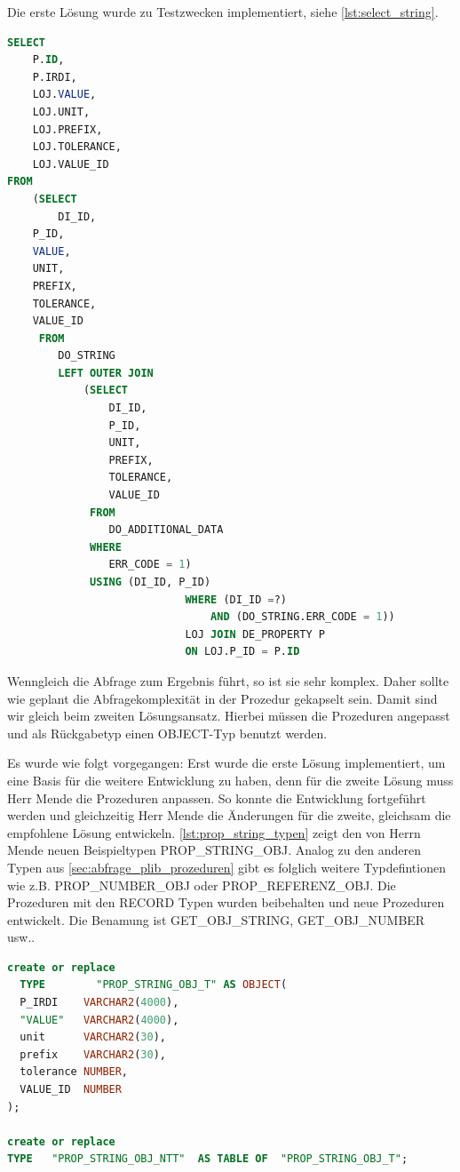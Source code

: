 Die erste Lösung wurde zu Testzwecken implementiert, siehe \autoref{lst:select_string}.

\begin{lstlisting}[caption=SELECT-Abfrage für String-Properties aus den Prozeduren, language=sql, label=lst:select_string]
SELECT 
    P.ID, 
    P.IRDI, 
    LOJ.VALUE, 
    LOJ.UNIT, 
    LOJ.PREFIX, 
    LOJ.TOLERANCE, 
    LOJ.VALUE_ID 
FROM 
    (SELECT 
    	DI_ID, 
	P_ID, 
	VALUE, 
	UNIT, 
	PREFIX, 
	TOLERANCE, 
	VALUE_ID
     FROM 
     	DO_STRING 
		LEFT OUTER JOIN 
			(SELECT 
				DI_ID, 
				P_ID, 
				UNIT, 
				PREFIX, 
				TOLERANCE, 
				VALUE_ID
			 FROM 
			 	DO_ADDITIONAL_DATA 
			 WHERE 
			 	ERR_CODE = 1)
			 USING (DI_ID, P_ID)
                          	WHERE (DI_ID =?) 
                          		AND (DO_STRING.ERR_CODE = 1))
                          	LOJ JOIN DE_PROPERTY P  
                          	ON LOJ.P_ID = P.ID
\end{lstlisting}

Wenngleich die Abfrage zum Ergebnis führt, so ist sie sehr komplex. Daher sollte wie geplant die Abfragekomplexität in der Prozedur gekapselt sein. Damit sind wir gleich beim zweiten Lösungsansatz. Hierbei müssen die Prozeduren angepasst und als Rückgabetyp einen OBJECT-Typ benutzt werden. 

Es wurde wie folgt vorgegangen: 
Erst wurde die erste Lösung implementiert, um eine Basis für die weitere Entwicklung zu haben, denn für die zweite Lösung muss Herr Mende die Prozeduren anpassen. So konnte die Entwicklung fortgeführt werden und gleichzeitig Herr Mende die Änderungen für die zweite, gleichsam die empfohlene Lösung entwickeln. \autoref{lst:prop_string_typen} zeigt den von Herrn Mende neuen Beispieltypen PROP\_STRING\_OBJ. Analog zu den anderen Typen aus \autoref{sec:abfrage_plib_prozeduren} gibt es folglich weitere Typdefintionen wie z.B. PROP\_NUMBER\_OBJ oder PROP\_REFERENZ\_OBJ. 
Die Prozeduren mit den RECORD Typen wurden beibehalten und neue Prozeduren entwickelt. Die Benamung ist GET\_OBJ\_STRING, GET\_OBJ\_NUMBER usw..

\begin{lstlisting}[caption=PROP\_STRING\_OBJ Typen, language=sql, label=lst:prop_string_typen]
create or replace
  TYPE        "PROP_STRING_OBJ_T" AS OBJECT(
  P_IRDI    VARCHAR2(4000),
  "VALUE"   VARCHAR2(4000),
  unit      VARCHAR2(30),
  prefix    VARCHAR2(30),
  tolerance NUMBER,
  VALUE_ID  NUMBER
);

create or replace
TYPE   "PROP_STRING_OBJ_NTT"  AS TABLE OF  "PROP_STRING_OBJ_T";
\end{lstlisting}

